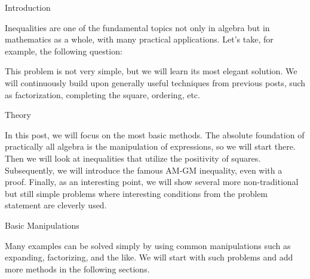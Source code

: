 





\sec Introduction

Inequalities are one of the fundamental topics not only in algebra but in mathematics as a whole, with many practical applications. Let's take, for example, the following question:


This problem is not very simple, but we will learn its most elegant solution. We will continuously build upon generally useful techniques from previous posts, such as factorization, completing the square, ordering, etc.

\sec Theory

In this post, we will focus on the most basic methods. The absolute foundation of practically all algebra is the manipulation of expressions, so we will start there. Then we will look at inequalities that utilize the positivity of squares. Subsequently, we will introduce the famous AM-GM inequality, even with a proof. Finally, as an interesting point, we will show several more non-traditional but still simple problems where interesting conditions from the problem statement are cleverly used.

\secc Basic Manipulations

Many examples can be solved simply by using common manipulations such as expanding, factorizing, and the like. We will start with such problems and add more methods in the following sections.



